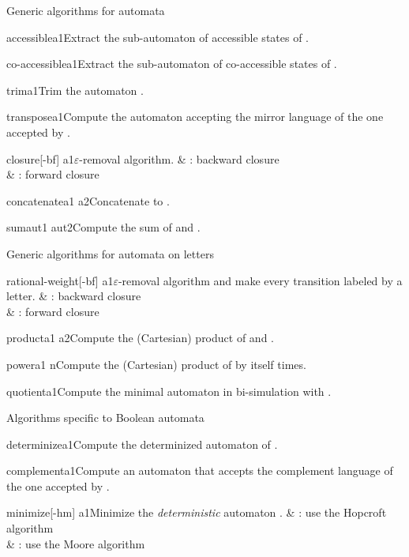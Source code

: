 \begin{fnsection}{Generic algorithms for automata}
\item{accessible}{a1}{Extract the sub-automaton of accessible states
    of .}
\item{co-accessible}{a1}{Extract the sub-automaton of co-accessible
    states of .}
\item{trim}{a1}{Trim the automaton .}
\item{transpose}{a1}{Compute the automaton accepting the mirror
    language of the one accepted by .}

\item{closure}{[-bf] a1}{$\varepsilon$-removal algorithm.}
  &  : backward closure\\
  &  : forward closure\\
\item{concatenate}{a1 a2}{Concatenate  to .}
\item{sum}{aut1 aut2}{Compute the sum of  and .}
\end{fnsection}

\begin{fnsection}{Generic algorithms for automata on letters}
\item{rational-weight}{[-bf] a1}{$\varepsilon$-removal algorithm and make
    every transition labeled by a letter.}
  &  : backward closure\\
  &  : forward closure\\
\item{product}{a1 a2}{Compute the (Cartesian) product of  and
    .}
\item{power}{a1 n}{Compute the (Cartesian) product of  by
    itself  times.}
\item{quotient}{a1}{Compute the minimal automaton in bi-simulation
    with .}  \hline
\end{fnsection}

\begin{fnsection}{Algorithms specific to Boolean automata}
\item{determinize}{a1}{Compute the determinized automaton of
    .}
\item{complement}{a1}{Compute an automaton that accepts the complement
    language of the one accepted by .}
\item{minimize}{[-hm] a1}{Minimize the {\em deterministic} automaton
    .}
  &  : use the Hopcroft algorithm\\
  &  : use the Moore algorithm\\
  \hline
\end{fnsection}

